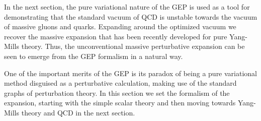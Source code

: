 \documentclass[aps,preprint]{revtex4}
\begin{document}
In the next section, the pure variational nature of the GEP is used as a tool 
for demonstrating that the standard vacuum of QCD is unstable towards the vacuum of massive gluons and quarks.
Expanding around the optimized vacuum we recover the massive expansion that has been recently developed for pure
Yang-Mills theory\cite{ptqcd0,ptqcd,ptqcd2}. Thus, the unconventional massive perturbative expansion can be seen 
to emerge from the GEP formalism in a natural way. 

One of the important merits of the GEP is its paradox of being a pure variational method disguised as a
perturbative calculation,  making use of the standard graphs of perturbation theory. In this section
we set the formalism of the expansion, starting with the simple scalar theory and then moving towards Yang-Mills
theory and QCD in the next section.
\end{document}
